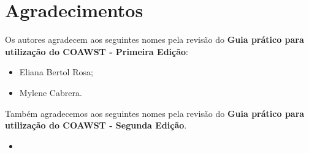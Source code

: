 \chapter*{Agradecimentos}


\bigskip
\noindent Os autores agradecem aos seguintes nomes pela revisão do \textbf{Guia prático para utilização do COAWST - Primeira Edição}:
\bigskip

\begin{itemize}
    \item Eliana Bertol Rosa;
    \item Mylene Cabrera.
\end{itemize}

\bigskip
\noindent Também agradecemos aos seguintes nomes pela revisão do \textbf{Guia prático para utilização do COAWST - Segunda Edição}.
\bigskip

\begin{itemize}
    \item 
\end{itemize}
